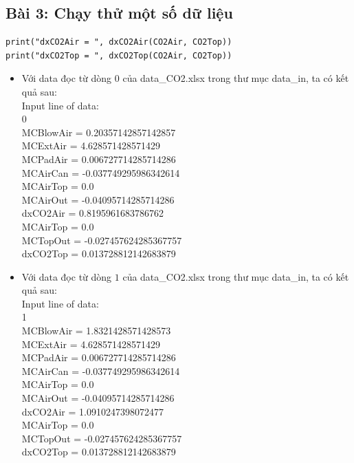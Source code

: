 \documentclass[a4paper]{article}
\begin{document}
\subsection{Bài 3: Chạy thử một số dữ liệu}
\begin{verbatim}
print("dxCO2Air = ", dxCO2Air(CO2Air, CO2Top))
print("dxCO2Top = ", dxCO2Top(CO2Air, CO2Top))
\end{verbatim}
\begin{itemize}
    \item Với data đọc từ dòng $0$ của data\_CO2.xlsx trong thư mục data\_in, ta có kết quả sau:\\
    Input line of data: \\
    0\\
    MCBlowAir =  0.20357142857142857\\
    MCExtAir =  4.628571428571429\\
    MCPadAir =  0.006727714285714286\\
    MCAirCan =  -0.037749295986342614\\
    MCAirTop =  0.0\\
    MCAirOut =  -0.04095714285714286\\
    dxCO2Air =  0.8195961683786762\\
    MCAirTop =  0.0\\
    MCTopOut =  -0.027457624285367757\\
    dxCO2Top =  0.013728812142683879\\
    \item Với data đọc từ dòng $1$ của data\_CO2.xlsx trong thư mục data\_in, ta có kết quả sau:\\
    Input line of data: \\
    1\\
    MCBlowAir =  1.8321428571428573\\
    MCExtAir =  4.628571428571429\\
    MCPadAir =  0.006727714285714286\\
    MCAirCan =  -0.037749295986342614\\
    MCAirTop =  0.0\\
    MCAirOut =  -0.04095714285714286\\
    dxCO2Air =  1.0910247398072477\\
    MCAirTop =  0.0\\
    MCTopOut =  -0.027457624285367757\\
    dxCO2Top =  0.013728812142683879\\
\end{itemize}
\end{document}
